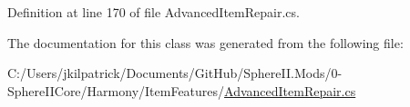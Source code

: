 Definition at line 170 of file Advanced\+Item\+Repair.\+cs.



The documentation for this class was generated from the following file\+:\begin{DoxyCompactItemize}
\item 
C\+:/\+Users/jkilpatrick/\+Documents/\+Git\+Hub/\+Sphere\+I\+I.\+Mods/0-\/\+Sphere\+I\+I\+Core/\+Harmony/\+Item\+Features/\mbox{\hyperlink{_advanced_item_repair_8cs}{Advanced\+Item\+Repair.\+cs}}\end{DoxyCompactItemize}
